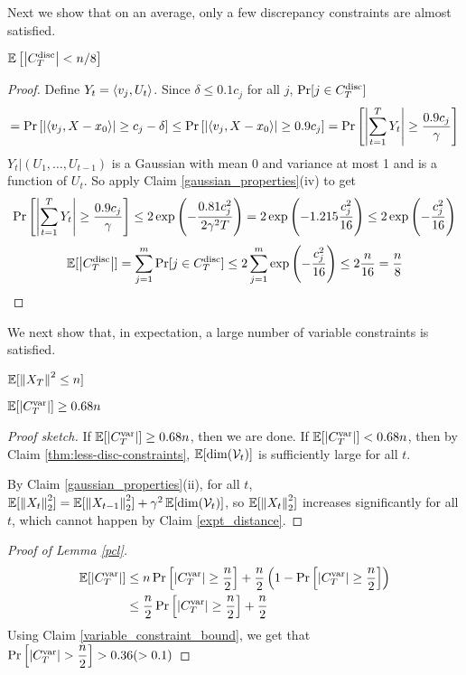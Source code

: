 Next we show that on an average, only a few discrepancy constraints are almost satisfied.
\begin{Claim}
\label{thm:less-disc-constraints}
$\operatorname{\mathbb{E}}\left[\left\lvert C^{\mathrm{disc}}_T \right\rvert < n/8 \right]$
\end{Claim}
\begin{proof}
Define $Y_t = \left\langle v_j,U_t\right\rangle$. Since $\delta \le 0.1 c_j$ for all $j$, $\Pr[j \in C^{\mathrm{disc}}_T]$
\[ = \Pr\left[ \left\lvert \left\langle v_j, X - x_0\right\rangle \right\rvert \ge c_j - \delta \right]
\le \Pr\left[ \left\lvert \left\langle v_j, X - x_0\right\rangle \right\rvert \ge 0.9c_j \right]
= \Pr\left[ \left\lvert \sum_{t=1}^T Y_t \right\rvert \ge \frac{0.9c_j}{\gamma} \right] \]
$Y_t|(U_1,\hdots,U_{t-1})$ is a Gaussian with mean 0 and variance at most 1 and is a function of $U_t$.
So apply Claim \ref{gaussian_properties}(iv) to get
\[ \Pr\left[ \left\lvert \sum_{t=1}^T Y_t \right\rvert \ge \frac{0.9c_j}{\gamma} \right]
\le 2\exp\left(-\frac{0.81 c_j^2}{2\gamma^2T}\right)
= 2\exp\left(-1.215 \frac{c_j^2}{16}\right)
\le 2\exp\left(-\frac{c_j^2}{16}\right) \]
\[ \operatorname{\mathbb{E}}[\left\lvert C^{\mathrm{disc}}_T \right\rvert]
= \sum_{j=1}^m \Pr[j \in C^{\mathrm{disc}}_T]
\le 2\sum_{j=1}^m \exp\left(-\frac{c_j^2}{16}\right)
\le 2\frac{n}{16} = \frac{n}{8} \]
\end{proof}

We next show that, in expectation, a large number of variable constraints is satisfied.
\begin{Claim} \label{expt_distance}
$\mathbb{E}[\left\lVert X_T \right\rVert^2 \leq n]$
\end{Claim}
\begin{Claim} \label{variable_constraint_bound}
$\mathbb{E}[\left\lvert C^{\mathrm{var}}_T \right\rvert] \geq 0.68n$
\end{Claim}
\begin{proof}[Proof sketch]
If $\operatorname{\mathbb{E}}[\left\lvert C^{\mathrm{var}}_T \right\rvert] \ge 0.68n$, then we are done.
If $\operatorname{\mathbb{E}}[\left\lvert C^{\mathrm{var}}_T \right\rvert] < 0.68n$, then by Claim \ref{thm:less-disc-constraints},
$\operatorname{\mathbb{E}}[\dim(\mathcal{V}_t)]$ is sufficiently large for all $t$.

By Claim \ref{gaussian_properties}(ii), for all $t$,
$\operatorname{\mathbb{E}}[\left\lVert X_t \right\rVert_2^2] = \operatorname{\mathbb{E}}[\left\lVert X_{t-1} \right\rVert_2^2] + \gamma^2\operatorname{\mathbb{E}}[\dim(\mathcal{V}_t)]$,
so $\operatorname{\mathbb{E}}[\left\lVert X_t \right\rVert_2^2]$ increases significantly for all $t$,
which cannot happen by Claim \ref{expt_distance}.
\end{proof}

\begin{proof}[Proof of Lemma \ref{pcl}]
\begin{align*}
  \mathbb{E}[\left\lvert C^{\mathrm{var}}_T \right\rvert]
&\leq n\Pr\left[\left\lvert C^{\mathrm{var}}_T \right\rvert \geq \dfrac{n}{2}\right] + \dfrac{n}{2}\left(1- \Pr\left[\left\lvert C^{\mathrm{var}}_T \right\rvert \geq \dfrac{n}{2}\right] \right )\\
&\leq \dfrac{n}{2}\Pr\left[\left\lvert C^{\mathrm{var}}_T \right\rvert \geq \dfrac{n}{2}\right]  + \dfrac{n}{2}
\end{align*}
Using Claim \ref{variable_constraint_bound}, we get that $\Pr\left[\left\lvert C^{\mathrm{var}}_T \right\rvert > \dfrac{n}{2}\right] > 0.36 (> 0.1)$
\end{proof}

